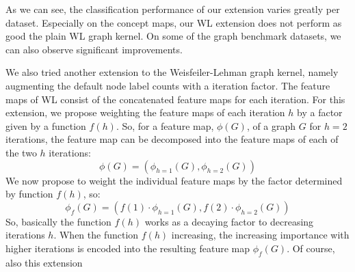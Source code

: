 As we can see, the classification performance of our extension varies greatly per dataset.
Especially on the concept maps, our WL extension does not perform as good the plain WL graph kernel.
On some of the graph benchmark datasets, we can also observe significant improvements.
 
\if
We also tried another extension to the Weisfeiler-Lehman graph kernel, namely augmenting the default node label counts with a iteration factor.
The feature maps of WL consist of the concatenated feature maps for each iteration.
For this extension, we propose weighting the feature maps of each iteration $h$ by a factor given by a function $f(h)$.
So, for a feature map, $\phi(G)$, of a graph $G$ for $h=2$ iterations, the feature map can be decomposed into the feature maps of each of the two $h$ iterations:
\begin{equation*}
\phi(G)=(\phi_{h=1}(G), \phi_{h=2}(G))
\end{equation*}
We now propose to weight the individual feature maps by the factor determined by function $f(h)$, so:
\begin{equation*}
\phi_{f}(G)=(f(1) \cdot \phi_{h=1}(G), f(2) \cdot \phi_{h=2}(G))
\end{equation*}
So, basically the function $f(h)$ works as a decaying factor to decreasing iterations $h$.
When the function $f(h)$ increasing, the increasing importance with higher iterations is encoded into the resulting feature map $\phi_f(G)$.
Of course, also this extension 
\fi
